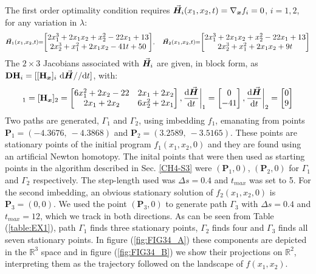 The first order optimality condition requires 
$\vec{\boldsymbol{H}}_i(x_1,x_2,t)=\nabla_{\bm{x}}f_i=0$, $i=1,2$,
for any variation in $\lambda$:
\begin{equation}
	\scriptstyle{
	\vec{\boldsymbol{H}}_1(x_1,x_2,t) = \begin{bmatrix}
		2x_1^3+2x_1x_2+x_2^2-22x_1+13\\
		2x_2^3+x_1^2+2x_1x_2-41t+50
	\end{bmatrix},\quad \vec{\boldsymbol{H}}_2(x_1,x_2,t) = \begin{bmatrix}
		2x_1^3+2x_1x_2+x_2^2-22x_1+13\\
		2x_2^3+x_1^2+2x_1x_2+9t
	\end{bmatrix}
}
	\label{eq:Sgrads}
\end{equation}
The $2\times 3$ Jacobians  associated with $\vec{\boldsymbol{H}}_i$ are given, in block 
form,
as $\bmat{DH}_i=[[\bmat{H}_{\bm{x}}]_i\ \text{d}\bvec{H}/^{}/\text{d}t]$, with:
\begin{equation}
	[\bmat{H}_{\bm{x}}]_1= [\bmat{H}_{\bm{x}}]_2 = \begin{bmatrix}
		6x_1^2+2x_2-22 & 2x_1+2x_2\\
		2x_1+2x_2 & 6x_2^2+2x_1
	\end{bmatrix}
	, \frac{\text{d}\bvec{H}}{\text{d}t}\bigg|_1=\begin{bmatrix}
		0\\
		-41
	\end{bmatrix},
\frac{\text{d}\bvec{H}}{\text{d}t}\bigg|_2=\begin{bmatrix}
		0\\
		9
	\end{bmatrix}
	\label{eq:JBS}
\end{equation}
Two paths are generated, $\mathit{\Gamma}_1$ and $\mathit{\Gamma}_2$, using
imbedding $f_1$,
emanating from points $\mathbf{P}_1=(-4.3676,\ -4.3868)$ and
$\mathbf{P}_2=(3.2589,\ -3.5165)$. These points are stationary points of the
initial program $f_1(x_1,x_2,0)$ and they are found using an artificial Newton
homotopy. The inital points that were then used as starting points in the 
algorithm
described in Sec. \ref{CH4-S3} were $(\mathbf{P}_1,0)$, $(\mathbf{P}_2,0)$ for
$\mathit{\Gamma}_1$ and $\mathit{\Gamma}_2$ respectively. The step-length used
was $\Delta s=0.4$ and $t_{max}$ was set to 5. For the second imbedding, an 
obvious stationary solution of
$f_2(x_1,x_2,0)$ is $\mathbf{P}_3=(0,0)$. We used the point $(\mathbf{P}_3,0)$ 
to generate path
$\mathit{\Gamma}_3$ with $\Delta s=0.4$ and $t_{max}=12$, which we track in 
both directions. As can be seen from
Table (\ref{table:EX1}), path $\mathit{\Gamma}_1$ finds three stationary
points, $\mathit{\Gamma}_2$ finds four and $\mathit{\Gamma}_3$ finds all seven
stationary points. In figure (\ref{fig:FIG34_A}) these components are 
depicted in the $\mathbb{R}^3$ space and in figure (\ref{fig:FIG34_B}) 
we show their projections on $\mathbb{R}^2$, interpreting them as the 
trajectory followed on the landscape of $f(x_1,x_2)$.

